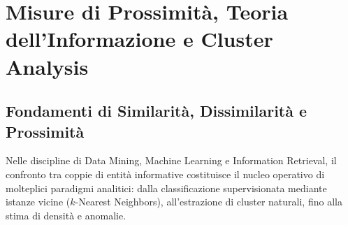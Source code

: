 \chapter{Misure di Prossimità, Teoria dell'Informazione e Cluster Analysis}
\label{chap:dm-similarity-clustering-foundations}

\FloatBarrier
\section{Fondamenti di Similarità, Dissimilarità e Prossimità}
\label{sec:dm-foundations-proximity}

Nelle discipline di Data Mining, Machine Learning e Information Retrieval, il confronto tra coppie di entità informative costituisce il nucleo operativo di molteplici paradigmi analitici: dalla classificazione supervisionata mediante istanze vicine ($k$-Nearest Neighbors), all'estrazione di cluster naturali, fino alla stima di densità e anomalie.

